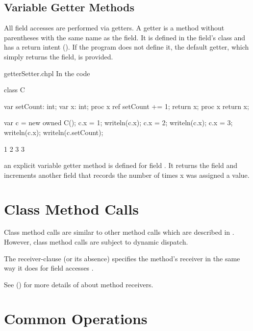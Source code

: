 \subsection{Variable Getter Methods}
\label{Getter_Methods}

All field accesses are performed via getters.  A getter is a method without
parentheses with the same name as the field. It is defined in the field's class
and has a  return intent ().  If the program
does not define it, the default getter, which simply returns the field, is
provided.

\begin{chapelexample}{getterSetter.chpl}
In the code
\begin{chapel}
class C {
  var setCount: int;
  var x: int;
  proc x ref {
    setCount += 1;
    return x;
  }
  proc x {
    return x;
  }

}
\end{chapel}
\begin{chapelpost}
var c = new owned C();
c.x = 1;
writeln(c.x);
c.x = 2;
writeln(c.x);
c.x = 3;
writeln(c.x);
writeln(c.setCount);
\end{chapelpost}
\begin{chapeloutput}
1
2
3
3
\end{chapeloutput}
an explicit variable getter method is defined for field .  It
returns the field  and increments another field that records
the number of times x was assigned a value.
\end{chapelexample}

\section{Class Method Calls}
\label{Class_Method_Calls}

Class method calls are similar to other method calls which are described
in . However, class method calls are subject to
dynamic dispatch.

The receiver-clause (or its absence) specifies the method's receiver in
the same way it does for field accesses .

See () for more details of about method
receivers.

\section{Common Operations}

